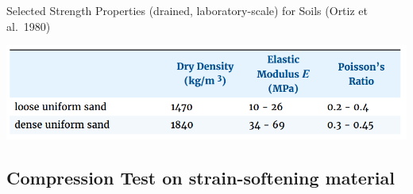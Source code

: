 \documentclass[a4paper, nobind]{templates/ociamthesis}
\begin{document}
Selected Strength Properties (drained, laboratory-scale) for Soils
(Ortiz et al.~1980)

\includegraphics[width=1\linewidth]{myfigureeeeee/typical_sand}

\hypertarget{compression-test-on-strain-softening-material}{%
\subsection{Compression Test on strain-softening material}\label{compression-test-on-strain-softening-material}}
\end{document}
